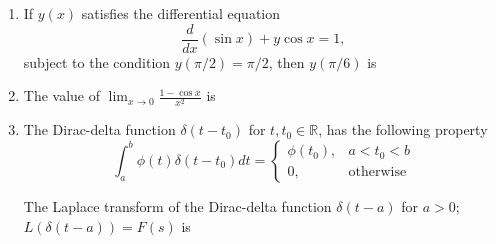 \documentclass[journal]{IEEEtran}
\begin{document}
\begin{enumerate}
\item If $y(x)$ satisfies the differential equation
\[
\frac{d}{dx}(\sin x) + y \cos x = 1,
\]
subject to the condition $y(\pi/2) = \pi/2$, then $y(\pi/6)$ is

\begin{enumerate}
\end{enumerate}

\hfill{}

\item The value of $\lim_{x \to 0} \frac{1-\cos x}{x^2}$ is

\begin{enumerate}
\end{enumerate}

\hfill{}

\item The Dirac-delta function $\delta(t - t_0)$ for $t, t_0 \in \mathbb{R}$, has the following property
\[
\int_a^b \phi(t) \delta(t - t_0) dt =
\begin{cases}
\phi(t_0), & a < t_0 < b \\
0, & \text{otherwise}
\end{cases}
\]

The Laplace transform of the Dirac-delta function $\delta(t - a)$ for $a > 0$;
$L(\delta(t - a)) = F(s)$ is

\begin{enumerate}
\end{enumerate}


\end{enumerate}
\end{document}

